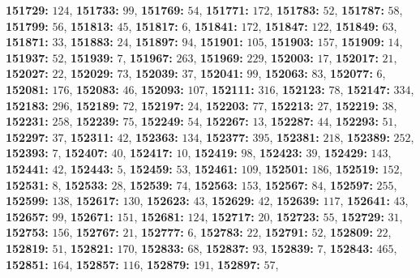 \textsf{\bfseries 151729:} $124$, \textsf{\bfseries 151733:} $99$, \textsf{\bfseries 151769:} $54$, \textsf{\bfseries 151771:} $172$, \textsf{\bfseries 151783:} $52$, \textsf{\bfseries 151787:} $58$, \textsf{\bfseries 151799:} $56$, \textsf{\bfseries 151813:} $45$, \textsf{\bfseries 151817:} $6$, \textsf{\bfseries 151841:} $172$, \textsf{\bfseries 151847:} $122$, \textsf{\bfseries 151849:} $63$, \textsf{\bfseries 151871:} $33$, \textsf{\bfseries 151883:} $24$, \textsf{\bfseries 151897:} $94$, \textsf{\bfseries 151901:} $105$, \textsf{\bfseries 151903:} $157$, \textsf{\bfseries 151909:} $14$, \textsf{\bfseries 151937:} $52$, \textsf{\bfseries 151939:} $7$, \textsf{\bfseries 151967:} $263$, \textsf{\bfseries 151969:} $229$, \textsf{\bfseries 152003:} $17$, \textsf{\bfseries 152017:} $21$, \textsf{\bfseries 152027:} $22$, \textsf{\bfseries 152029:} $73$, \textsf{\bfseries 152039:} $37$, \textsf{\bfseries 152041:} $99$, \textsf{\bfseries 152063:} $83$, \textsf{\bfseries 152077:} $6$, \textsf{\bfseries 152081:} $176$, \textsf{\bfseries 152083:} $46$, \textsf{\bfseries 152093:} $107$, \textsf{\bfseries 152111:} $316$, \textsf{\bfseries 152123:} $78$, \textsf{\bfseries 152147:} $334$, \textsf{\bfseries 152183:} $296$, \textsf{\bfseries 152189:} $72$, \textsf{\bfseries 152197:} $24$, \textsf{\bfseries 152203:} $77$, \textsf{\bfseries 152213:} $27$, \textsf{\bfseries 152219:} $38$, \textsf{\bfseries 152231:} $258$, \textsf{\bfseries 152239:} $75$, \textsf{\bfseries 152249:} $54$, \textsf{\bfseries 152267:} $13$, \textsf{\bfseries 152287:} $44$, \textsf{\bfseries 152293:} $51$, \textsf{\bfseries 152297:} $37$, \textsf{\bfseries 152311:} $42$, \textsf{\bfseries 152363:} $134$, \textsf{\bfseries 152377:} $395$, \textsf{\bfseries 152381:} $218$, \textsf{\bfseries 152389:} $252$, \textsf{\bfseries 152393:} $7$, \textsf{\bfseries 152407:} $40$, \textsf{\bfseries 152417:} $10$, \textsf{\bfseries 152419:} $98$, \textsf{\bfseries 152423:} $39$, \textsf{\bfseries 152429:} $143$, \textsf{\bfseries 152441:} $42$, \textsf{\bfseries 152443:} $5$, \textsf{\bfseries 152459:} $53$, \textsf{\bfseries 152461:} $109$, \textsf{\bfseries 152501:} $186$, \textsf{\bfseries 152519:} $152$, \textsf{\bfseries 152531:} $8$, \textsf{\bfseries 152533:} $28$, \textsf{\bfseries 152539:} $74$, \textsf{\bfseries 152563:} $153$, \textsf{\bfseries 152567:} $84$, \textsf{\bfseries 152597:} $255$, \textsf{\bfseries 152599:} $138$, \textsf{\bfseries 152617:} $130$, \textsf{\bfseries 152623:} $43$, \textsf{\bfseries 152629:} $42$, \textsf{\bfseries 152639:} $117$, \textsf{\bfseries 152641:} $43$, \textsf{\bfseries 152657:} $99$, \textsf{\bfseries 152671:} $151$, \textsf{\bfseries 152681:} $124$, \textsf{\bfseries 152717:} $20$, \textsf{\bfseries 152723:} $55$, \textsf{\bfseries 152729:} $31$, \textsf{\bfseries 152753:} $156$, \textsf{\bfseries 152767:} $21$, \textsf{\bfseries 152777:} $6$, \textsf{\bfseries 152783:} $22$, \textsf{\bfseries 152791:} $52$, \textsf{\bfseries 152809:} $22$, \textsf{\bfseries 152819:} $51$, \textsf{\bfseries 152821:} $170$, \textsf{\bfseries 152833:} $68$, \textsf{\bfseries 152837:} $93$, \textsf{\bfseries 152839:} $7$, \textsf{\bfseries 152843:} $465$, \textsf{\bfseries 152851:} $164$, \textsf{\bfseries 152857:} $116$, \textsf{\bfseries 152879:} $191$, \textsf{\bfseries 152897:} $57$, 

